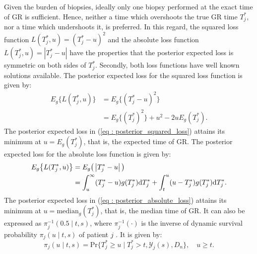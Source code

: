 Given the burden of biopsies, ideally only one biopsy performed at the exact time of GR is sufficient. Hence, neither a time which overshoots the true GR time $T^*_j$, nor a time which undershoots it, is preferred. In this regard, the squared loss function $L(T^*_j, u) = (T^*_j - u)^2$ and the absolute loss function $L(T^*_j, u) = \left|{T^*_j - u}\right|$ have the properties that the posterior expected loss is symmetric on both sides of $T^*_j$. Secondly, both loss functions have well known solutions available. The posterior expected loss for the squared loss function is given by:
\begin{equation}
\label{eq : posterior_squared_loss}
\begin{split}
E_g\big\{L(T^*_j, u)\big\} &= E_g\big\{(T^*_j - u)^2\big\}\\
&=E_g\big\{(T^*_j)^2\big\} + u^2 -2uE_g(T^*_j).
\end{split}
\end{equation}
The posterior expected loss in (\ref{eq : posterior_squared_loss}) attains its minimum at $u = E_g(T^*_j)$, that is, the expected time of GR. The posterior expected loss for the absolute loss function is given by:
\begin{equation}
\label{eq : posterior_absolute_loss}
\begin{split}
E_g\big\{L(T^*_j, u)\big\} &= E_g\big(\left|{T^*_j - u}\right|\big)\\
&= \int_u^\infty (T^*_j - u) g(T^*_j)\rmn{d} T^*_j + \int_t^u (u - T^*_j) g(T^*_j)\rmn{d} T^*_j.
\end{split}
\end{equation}
The posterior expected loss in (\ref{eq : posterior_absolute_loss}) attains its minimum at $u=\mbox{median}_g(T^*_j)$, that is, the median time of GR. It can also be expressed as $\pi_j^{-1}(0.5 \mid t,s)$, where $\pi_j^{-1}(\cdot)$ is the inverse of dynamic survival probability $\pi_j(u \mid t, s)$ of patient $j$ \citep{rizopoulos2011dynamic}. It is given by:
\begin{equation*}
\label{eq : dynamic_surv_prob}
\pi_j(u \mid t, s) = \mbox{Pr}\big\{T^*_j \geq u \mid  T^*_j >t, \mathcal{Y}_j(s), D_n\big\}, \quad u \geq t.
\end{equation*}

